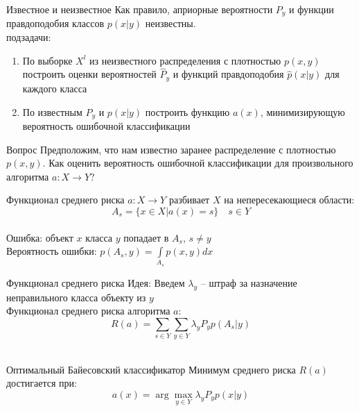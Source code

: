 \documentclass[10pt]{beamer}
\begin{document}
\begin{frame}{Известное и неизвестное}
  Как правило, априорные вероятности $P_y$ и функции правдоподобия классов $p(x|y)$ неизвестны.\\
  \pause
   подзадачи:
  \begin{enumerate}
    \item По выборке $X^l$ из неизвестного распределения с плотностью $p(x, y)$ построить оценки вероятностей $\hat{P}_y$ и функций правдоподобия $\hat{p}(x|y)$ для каждого класса
    \item По известным $P_y$ и $p(x|y)$ построить функцию $a(x)$, минимизирующую вероятность ошибочной классификации
  \end{enumerate}
\end{frame}

\begin{frame}{Вопрос}
  \centering
  Предположим, что нам известно заранее распределение с плотностью $p(x, y)$. Как оценить вероятность ошибочной классификации для произвольного алгоритма $a: X \rightarrow Y$?
\end{frame}

\begin{frame}{Функционал среднего риска}
  $a: X \rightarrow Y$ разбивает $X$ на непересекающиеся области:\\
  $$A_s = \{x \in X | a(x) = s \} \quad s \in Y $$\\
  \bigbreak 
  \pause
  \alert{Ошибка}: объект $x$ класса $y$ попадает в $A_s$, $s \neq y$\\
  \bigbreak
  Вероятность ошибки: $p(A_s, y) = \int\limits_{A_s} p(x, y) dx$
\end{frame}

\begin{frame}{Функционал среднего риска}
  \alert{Идея}: Введем $\lambda_{y}$ -- штраф за назначение неправильного класса объекту из $y$\\
  \pause
  \bigbreak
  Функционал среднего риска алгоритма $a$:\\
  $$R(a) = \sum\limits_{s \in Y} \sum\limits_{y \in Y} \lambda_{y} P_y p(A_s|y)$$\\
\end{frame}

{
\begin{frame}{Оптимальный Байесовский классификатор}
  Минимум среднего риска $R(a)$ достигается при:\\
  $$a(x) = \arg\max\limits_{y \in Y} \lambda_y P_y p(x|y)$$
\end{frame}
}
\end{document}
